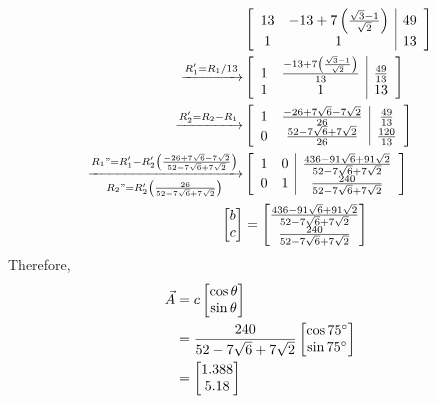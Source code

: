 \documentclass[12pt]{article}
\providecommand{\brak}[1]{\ensuremath{\left(#1\right)}}
\begin{document}
\begin{align}
&\left[
\begin{array}{cc|c}
13&-13+7\brak{\frac{\sqrt{3}-1}{\sqrt{2}}}&49\\
1&1&13\end{array}
\right]\\
\xrightarrow{R_1'=R_1/13}&\left[
\begin{array}{cc|c}
1&\frac{-13+7\brak{\frac{\sqrt{3}-1}{\sqrt{2}}}}{13}&\frac{49}{13}\\
1&1&13\end{array}
\right]\\
 \xrightarrow{R_2'= R_2-R_1}&\left[
\begin{array}{cc|c}
1&\frac{-26+7\sqrt{6}-7\sqrt{2}}{26}&\frac{49}{13}\\
0&\frac{52-7\sqrt{6}+7\sqrt{2}}{26}&\frac{120}{13}\end{array}
\right]\\
  \xrightarrow[R_2"=R_2'\brak{\frac{26}{52-7\sqrt{6}+7\sqrt{2}}}]{R_1"= R_1'-R_2'\brak{\frac{-26+7\sqrt{6}-7\sqrt{2}}{52-7\sqrt{6}+7\sqrt{2}}}}&\left[
\begin{array}{cc|c}
1&0&\frac{436-91\sqrt{6}+91\sqrt{2}}{52-7\sqrt{6}+7\sqrt{2}}\\
0&1&\frac{240}{52-7\sqrt{6}+7\sqrt{2}}\end{array}
\right]\\
 \begin{bmatrix}
     b\\c
 \end{bmatrix}&=\begin{bmatrix}
   \frac{436-91\sqrt{6}+91\sqrt{2}}{52-7\sqrt{6}+7\sqrt{2}}\\\frac{240}{52-7\sqrt{6}+7\sqrt{2}}
 \end{bmatrix}
\end{align}
Therefore,
\begin{align}
    \Vec{A}&=c\begin{bmatrix}
        \cos{\theta}\\\sin{\theta}
    \end{bmatrix}\\
    &=\frac{240}{52-7\sqrt{6}+7\sqrt{2}}\begin{bmatrix}
        \cos{75\degree}\\\sin{75\degree}
    \end{bmatrix}\\
    &=\begin{bmatrix}
        1.388\\5.18
    \end{bmatrix}\\
\end{align}
\end{document}
